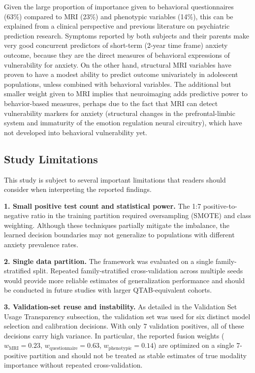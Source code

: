 \documentclass[10pt,letterpaper]{article}
\newcommand{\hlpar}[1]{\leavevmode\colorbox{yellow!30}{\parbox{\dimexpr\linewidth-2\fboxsep\relax}{#1}}\vspace{2pt}}
\begin{document}
                                                                                                                                                                         Given the large proportion of importance given to behavioral questionnaires (63\%) compared to MRI (23\%) and phenotypic variables (14\%), this can be explained from a clinical perspective and previous literature on psychiatric prediction research. Symptoms reported by both subjects and their parents make very good concurrent predictors of short-term (2-year time frame) anxiety outcome, because they are the direct measures of behavioral expressions of vulnerability for anxiety. On the other hand, structural MRI variables have proven to have a modest ability to predict outcome univariately in adolescent populations, unless combined with behavioral variables. The additional but smaller weight given to MRI implies that neuroimaging adds predictive power to behavior-based measures, perhaps due to the fact that MRI can detect vulnerability markers for anxiety (structural changes in the prefrontal-limbic system and immaturity of the emotion regulation neural circuitry), which have not developed into behavioral vulnerability yet.

                                                                                                                                                                          \subsection*{Study Limitations}

\hlpar{This study is subject to several important limitations that readers should consider when interpreting the reported findings.}

\hlpar{\textbf{1. Small positive test count and statistical power.} The 1:7 positive-to-negative ratio in the training partition required oversampling (SMOTE) and class weighting. Although these techniques partially mitigate the imbalance, the learned decision boundaries may not generalize to populations with different anxiety prevalence rates.}

\hlpar{\textbf{2. Single data partition.} The framework was evaluated on a single family-stratified split. Repeated family-stratified cross-validation across multiple seeds would provide more reliable estimates of generalization performance and should be conducted in future studies with larger QTAB-equivalent cohorts.}

\hlpar{\textbf{3. Validation-set reuse and instability.} As detailed in the Validation Set Usage Transparency subsection, the validation set was used for six distinct model selection and calibration decisions. With only 7 validation positives, all of these decisions carry high variance. In particular, the reported fusion weights ($w_{\text{MRI}} = 0.23$, $w_{\text{questionnaire}} = 0.63$, $w_{\text{phenotypic}} = 0.14$) are optimized on a single 7-positive partition and should not be treated as stable estimates of true modality importance without repeated cross-validation.}
\end{document}
